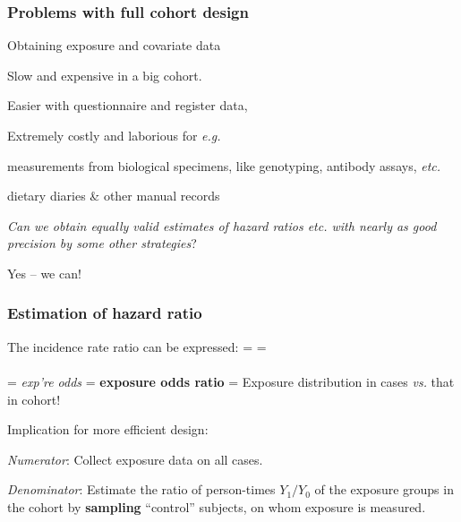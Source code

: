 \documentclass[12pt,dvipsnames,t,handout%
,aspectratio=169%
]{beamer}
\begin{document}

\begin{frame}
\frametitle{Problems with full cohort design}


Obtaining exposure and covariate data
\pause
\bi
\item Slow and expensive in a big cohort. \pause
\item Easier with questionnaire and register data, \pause
\item Extremely costly and laborious for {\it e.g.} 
\bi
{\normalsize
\item[--]   measurements from biological specimens, 
    like genotyping, antibody assays, {\it etc.} %
    \medskip
\item[--] dietary diaries \& other manual records
}
\ei
\ei
\pause

\emph{ Can we obtain equally valid estimates of hazard ratios
etc. with nearly as good precision by some other
strategies}? 
\pause

\medskip
Yes -- we can!

\end{frame}

\begin{frame}
\frametitle{Estimation of hazard ratio}

The incidence rate ratio can be expressed:
\pause
\bes
    =    
    =  
				    {}
				    \\ { } \\ 
	  \pause			    
              =  
                 {\textit{exp're odds} }   
             = \textbf{exposure odds ratio}   
\ees
\pause
= Exposure distribution in cases {\it vs.} that in cohort!

\pause
\bigskip
Implication for more efficient design: 
\pause
\bi 
\item {\it Numerator}: Collect exposure data on all cases. \pause
\item {\it Denominator}: Estimate the ratio of
person-times $Y_1/Y_0$ of the exposure groups in the cohort by
\textbf{sampling}  ``control'' subjects,
 on whom exposure is measured. 
\ei
\end{frame}  
 
\end{document}
